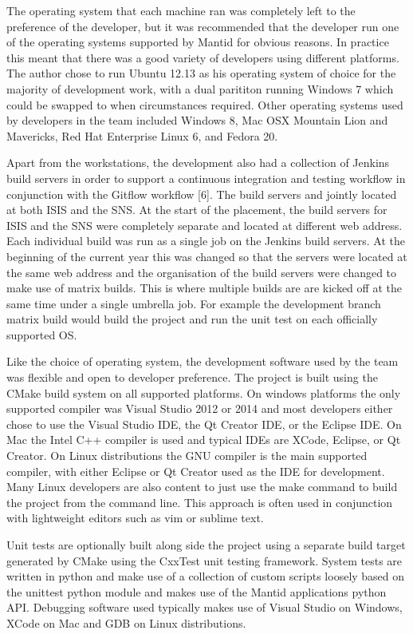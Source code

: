 \documentclass[paper=a4, fontsize=11pt]{scrartcl}	%
\numberwithin{equation}{section}															%
\numberwithin{figure}{section}																%
\numberwithin{table}{section}
\begin{document}
The operating system that each machine ran was completely left to the
preference of the developer, but it was recommended that the developer
run one of the operating systems supported by Mantid for obvious
reasons. In practice this meant that there was a good variety of
developers using different platforms. The author chose to run Ubuntu
12.13 as his operating system of choice for the majority of development
work, with a dual parititon running Windows 7 which could be swapped to
when circumstances required. Other operating systems used by developers
in the team included Windows 8, Mac OSX Mountain Lion and Mavericks, Red
Hat Enterprise Linux 6, and Fedora 20.

Apart from the workstations, the development also had a collection of
Jenkins build servers in order to support a continuous integration and
testing workflow in conjunction with the Gitflow workflow {[}6{]}. The
build servers and jointly located at both ISIS and the SNS. At the start
of the placement, the build servers for ISIS and the SNS were completely
separate and located at different web address. Each individual build was
run as a single job on the Jenkins build servers. At the beginning of
the current year this was changed so that the servers were located at
the same web address and the organisation of the build servers were
changed to make use of matrix builds. This is where multiple builds are
are kicked off at the same time under a single umbrella job. For example
the development branch matrix build would build the project and run the
unit test on each officially supported OS.

Like the choice of operating system, the development software used by
the team was flexible and open to developer preference. The project is
built using the CMake build system on all supported platforms. On
windows platforms the only supported compiler was Visual Studio 2012 or
2014 and most developers either chose to use the Visual Studio IDE, the
Qt Creator IDE, or the Eclipse IDE. On Mac the Intel C++ compiler is
used and typical IDEs are XCode, Eclipse, or Qt Creator. On Linux
distributions the GNU compiler is the main supported compiler, with
either Eclipse or Qt Creator used as the IDE for development. Many Linux
developers are also content to just use the make command to build the
project from the command line. This approach is often used in
conjunction with lightweight editors such as vim or sublime text.

Unit tests are optionally built along side the project using a separate
build target generated by CMake using the CxxTest unit testing
framework. System tests are written in python and make use of a
collection of custom scripts loosely based on the unittest python module
and makes use of the Mantid applications python API. Debugging software
used typically makes use of Visual Studio on Windows, XCode on Mac and
GDB on Linux distributions.
\end{document}
